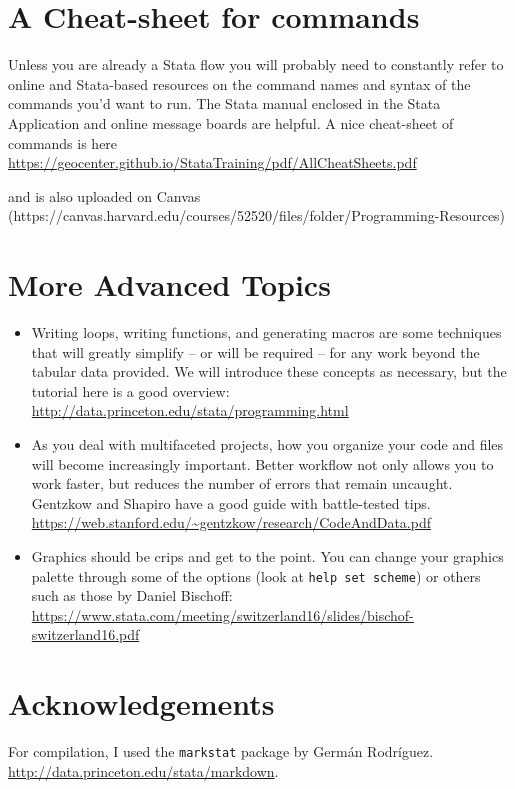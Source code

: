 \documentclass[]{article}
\providecommand{\tightlist}{%
  \setlength{\itemsep}{0pt}\setlength{\parskip}{0pt}}
\begin{document}
\section{A Cheat-sheet for commands}\label{a-cheat-sheet-for-commands}

Unless you are already a Stata flow you will probably need to constantly
refer to online and Stata-based resources on the command names and
syntax of the commands you'd want to run. The Stata manual enclosed in
the Stata Application and online message boards are helpful. A nice
cheat-sheet of commands is here
\url{https://geocenter.github.io/StataTraining/pdf/AllCheatSheets.pdf}

and is also uploaded on Canvas
(https://canvas.harvard.edu/courses/52520/files/folder/Programming-Resources)

\section{More Advanced Topics}\label{more-advanced-topics}

\begin{itemize}
\tightlist
\item
  Writing loops, writing functions, and generating macros are some
  techniques that will greatly simplify -- or will be required -- for
  any work beyond the tabular data provided. We will introduce these
  concepts as necessary, but the tutorial here is a good overview:
  \url{http://data.princeton.edu/stata/programming.html}
\item
  As you deal with multifaceted projects, how you organize your code and
  files will become increasingly important. Better workflow not only
  allows you to work faster, but reduces the number of errors that
  remain uncaught. Gentzkow and Shapiro have a good guide with
  battle-tested tips.
  \url{https://web.stanford.edu/~gentzkow/research/CodeAndData.pdf}
\item
  Graphics should be crips and get to the point. You can change your
  graphics palette through some of the options (look at
  \texttt{help\ set\ scheme}) or others such as those by Daniel
  Bischoff:
  \url{https://www.stata.com/meeting/switzerland16/slides/bischof-switzerland16.pdf}
\end{itemize}

\section{Acknowledgements}\label{acknowledgements}

For compilation, I used the \texttt{markstat} package by Germán
Rodríguez. \url{http://data.princeton.edu/stata/markdown}.
\end{document}
